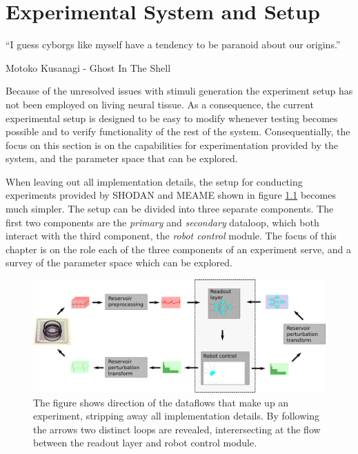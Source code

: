 \chapter{Experimental System and Setup}
\epigraph{“I guess cyborgs like myself have a tendency to be paranoid about our origins.”}
{Motoko Kusanagi - Ghost In The Shell}
Because of the unresolved issues with stimuli generation the experiment setup has not been
employed on living neural tissue.
As a consequence, the current experimental setup is designed to be easy to
modify whenever testing becomes possible and to verify functionality of the rest
of the system.
Consequentially, the focus on this section is on the capabilities for experimentation
provided by the system, and the parameter space that can be explored.\par
%
When leaving out all implementation details, the setup for conducting experiments
provided by SHODAN and MEAME shown in figure \ref{figExperimentLoop} becomes much simpler.
The setup can be divided into three separate components.
The first two components are the \emph{primary} and \emph{secondary} dataloop,
which both interact with the third component, the \emph{robot control} module.
The focus of this chapter is on the role each of the three components of an
experiment serve, and a survey of the parameter space which can be explored. 
\begin{figure}[h!]
  \centering
  \includegraphics[width=1\textwidth]{fig/experimentLoopFull.png}
  \caption[Overview of experiment dataflow]{
    The figure shows direction of the dataflows that make up an experiment,
    stripping away all implementation details.
    By following the arrows two distinct loops are revealed, interersecting at
    the flow between the readout layer and robot control module.
  }
  \label{figExperimentLoop}
\end{figure}
%
